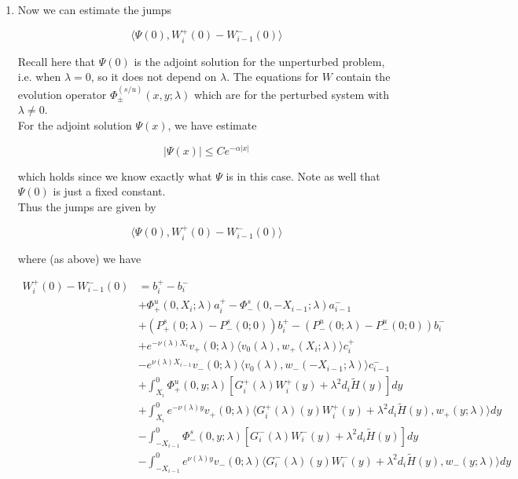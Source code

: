 \documentclass[12pt]{article}
\begin{document}
\begin{enumerate}
\item Now we can estimate the jumps

\[
\langle \Psi(0), W_i^+(0) - W_{i-1}^-(0) \rangle 
\]

Recall here that $\Psi(0)$ is the adjoint solution for the unperturbed problem, i.e. when $\lambda = 0$, so it does not depend on $\lambda$. The equations for $W$ contain the evolution operator $\Phi^{(s/u)}_\pm(x, y; \lambda)$ which are for the perturbed system with $\lambda \neq 0$.\\

For the adjoint solution $\Psi(x)$, we have estimate 

\[
|\Psi(x)| \leq C e^{-\alpha|x|}
\]

which holds since we know exactly what $\Psi$ is in this case. Note as well that $\Psi(0)$ is just a fixed constant.\\

Thus the jumps are given by

\[
\langle \Psi(0), W_i^+(0) - W_{i-1}^-(0) \rangle 
\]

where (as above) we have

\begin{align*}
W_i^+(0) - W_{i-1}^-(0) &= b_i^+ - b_i^- \\
&+ \Phi^u_+(0, X_i; \lambda)a_i^+ - \Phi^s_-(0, -X_{i-1}; \lambda)a_{i-1}^- \\
&+(P^s_+(0; \lambda) - P^s_-(0; 0))b_i^+  - (P^u_-(0; \lambda) - P^u_-(0; 0))b_i^- \\
&+ e^{-\nu(\lambda)X_i} v_+(0; \lambda) \langle v_0(\lambda), w_+(X_i; \lambda) \rangle c_i^+ \\
&- e^{\nu(\lambda)X_{i-1}} v_-(0; \lambda) \langle v_0(\lambda), w_-(-X_{i-1}; \lambda) \rangle c_{i-1}^- \\
&+ \int_{X_i}^0 \Phi^u_+(0, y; \lambda) [ G_i^+(\lambda)W_i^+(y) + \lambda^2 d_i \tilde{H}(y) ] dy \\
&+ \int_{X_i}^0 e^{-\nu(\lambda)y} v_+(0; \lambda) \langle G_i^+(\lambda)(y)W_i^+(y) + \lambda^2 d_i \tilde{H}(y), w_+(y; \lambda) \rangle dy \\
&- \int_{-X_{i-1}}^0 \Phi^s_-(0, y; \lambda) [ G_i^-(\lambda)W_i^-(y) + \lambda^2 d_i \tilde{H}(y) ] dy \\
&- \int_{-X_{i-1}}^0
e^{\nu(\lambda)y} v_-(0; \lambda) \langle G_i^-(\lambda)(y)W_i^-(y) + \lambda^2 d_i \tilde{H}(y), w_-(y; \lambda) \rangle dy \\
\end{align*}


\end{enumerate}
\end{document}
